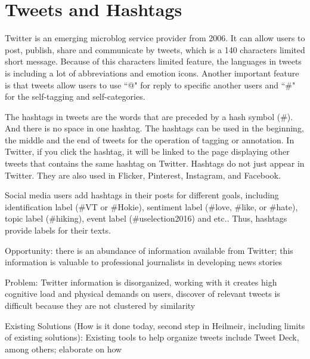 




\section{Tweets and Hashtags}

Twitter is an emerging microblog service provider from 2006. It can allow users to post, publish, share and communicate by tweets, which is a 140 characters limited short message. Because of this characters limited feature, the languages in tweets is including a lot of abbreviations and emotion icons. Another important feature is that tweets allow users to use ``@" for reply to specific another users and ``\#" for the self-tagging and self-categories. 

The hashtags in tweets are the words that are preceded by a hash symbol (\#). And there is no space in one hashtag. The hashtags can be used in the beginning, the middle and the end of tweets for the operation of tagging or annotation. In Twitter, if you click the hashtag, it will be linked to the page displaying other tweets that contains the same hashtag on Twitter. Hashtags do not just appear in Twitter. They are also used in Flicker, Pinterest, Instagram, and Facebook. 


Social media users add hashtags in their posts for different goals, including identification label (\#VT or \#Hokie), sentiment label (\#love, \#like, or \#hate), topic label (\#hiking), event label (\#uselection2016) and etc.. Thus, hashtags provide labels for their texts.



Opportunity: there is an abundance of information available from Twitter; this information is valuable to professional journalists in developing news stories

Problem: Twitter information is disorganized, working with it creates high cognitive load and physical demands on users, discover of relevant tweets is difficult because they are not clustered by similarity 

Existing Solutions (How is it done today, second step in Heilmeir, including limits of existing solutions): Existing tools to help organize tweets include Tweet Deck, among others; elaborate on how


